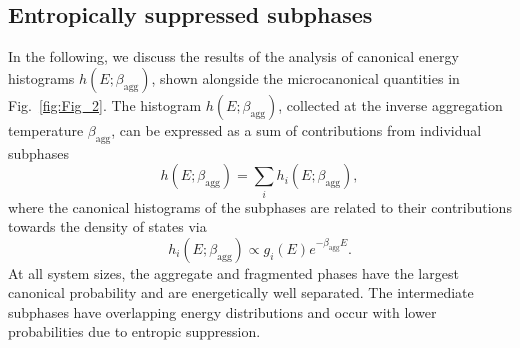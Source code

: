 \documentclass[12pt]{report}
\begin{document}
\subsection{Entropically suppressed subphases}
%
In the following, we discuss the results of the analysis of canonical 
energy histograms $h(E;\beta_{\mathrm{agg}})$, shown alongside 
the microcanonical quantities in Fig.~\ref{fig:Fig_2}. The histogram 
$h(E;\beta_{\mathrm{agg}})$, collected at the inverse aggregation
temperature $\beta_{\mathrm{agg}}$, can be expressed as a sum
of contributions from individual subphases
%
\begin{equation}
h(E;\beta_{\mathrm{agg}}) = \sum_{i}h_{i}(E;\beta_{\mathrm{agg}}),
\end{equation}  
%
where the canonical histograms of the subphases are
related to their contributions towards the density of states via
\begin{equation}
h_{i}(E;\beta_{\mathrm{agg}}) \propto g_{i}(E)e^{-\beta_{\mathrm{agg}}E}.
\end{equation}
%
At all system sizes, the aggregate and fragmented phases have the 
largest canonical probability and are energetically well separated.
The intermediate subphases have overlapping energy distributions
and occur with lower probabilities due to entropic suppression.
\end{document}
